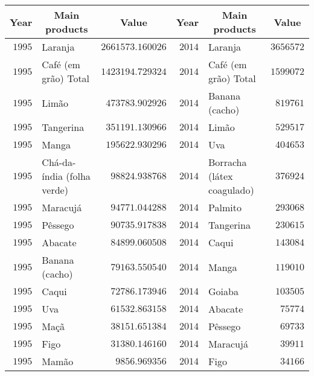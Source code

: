 \begin{table}[!tbp]
\begin{center}
\begin{tabular}{rlrrlr}
\hline\hline
\multicolumn{1}{c}{Year}&\multicolumn{1}{c}{Main products}&\multicolumn{1}{c}{Value}&\multicolumn{1}{c}{Year}&\multicolumn{1}{c}{Main products}&\multicolumn{1}{c}{Value}\tabularnewline
\hline
$1995$&Laranja&$2661573.160026$&$2014$&Laranja&$3656572$\tabularnewline
$1995$&Café (em grão) Total&$1423194.729324$&$2014$&Café (em grão) Total&$1599072$\tabularnewline
$1995$&Limão&$ 473783.902926$&$2014$&Banana (cacho)&$ 819761$\tabularnewline
$1995$&Tangerina&$ 351191.130966$&$2014$&Limão&$ 529517$\tabularnewline
$1995$&Manga&$ 195622.930296$&$2014$&Uva&$ 404653$\tabularnewline
$1995$&Chá-da-índia (folha verde)&$  98824.938768$&$2014$&Borracha (látex coagulado)&$ 376924$\tabularnewline
$1995$&Maracujá&$  94771.044288$&$2014$&Palmito&$ 293068$\tabularnewline
$1995$&Pêssego&$  90735.917838$&$2014$&Tangerina&$ 230615$\tabularnewline
$1995$&Abacate&$  84899.060508$&$2014$&Caqui&$ 143084$\tabularnewline
$1995$&Banana (cacho)&$  79163.550540$&$2014$&Manga&$ 119010$\tabularnewline
$1995$&Caqui&$  72786.173946$&$2014$&Goiaba&$ 103505$\tabularnewline
$1995$&Uva&$  61532.863158$&$2014$&Abacate&$  75774$\tabularnewline
$1995$&Maçã&$  38151.651384$&$2014$&Pêssego&$  69733$\tabularnewline
$1995$&Figo&$  31380.146160$&$2014$&Maracujá&$  39911$\tabularnewline
$1995$&Mamão&$   9856.969356$&$2014$&Figo&$  34166$\tabularnewline
\hline
\end{tabular}\end{center}

\end{table}
